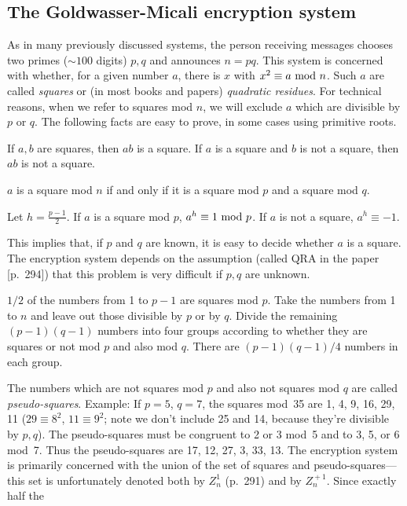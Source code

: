 \subsection{The Goldwasser-Micali encryption system}
As in many previously discussed systems, the person receiving messages
chooses two primes ($\sim100$ digits) $p,q$ and announces $n=pq$.
This system is concerned with whether, for a given number $a$, there is
$x$ with $x^2\equiv a\hbox{ mod }n$. Such $a$ are called {\it squares\/} or (in most
books and papers) {\it quadratic residues}. For technical reasons, when
we refer to squares mod $n$, we will exclude $a$ which are divisible by
$p$ or $q$.
The following facts are easy to prove, in some cases using primitive roots.
\begin{Le} If $a,b$ are squares, then $ab$ is a square.
If $a$ is a square and $b$ is not a square, then $ab$ is not a square.
\label{prod}\end{Le}
\begin{Le} $a$ is a square mod $n$ if and only if it is a square mod $p$
and a square mod $q$.\label{kn1}\end{Le}
\begin{Le} Let $h=\frac{p-1}2$.  If $a$ is a square mod $p$, $a^h\equiv1\hbox{ mod }p$.
If $a$ is not a square, $a^h\equiv-1$.\label{kn2}\end{Le}
This implies that, if $p$ and $q$ are known, it is easy to decide whether
$a$ is a square.  The encryption system depends on the assumption (called
QRA in the paper [p.~294]) that this problem is very difficult if $p,q$
are unknown.\begin{Le} $1/2$ of the numbers from 1 to $p-1$ are squares
mod $p$.     Take the numbers from 1 to $n$ and leave out those divisible
by $p$ or by $q$. Divide the remaining $(p-1)(q-1)$ numbers into four groups 
according to whether they are squares or not mod $p$ and also mod $q$.
There are $(p-1)(q-1)/4$ numbers in each group.\end{Le}
\pq The numbers which are not squares mod $p$ and also not squares mod $q$
are called {\it pseudo-squares}.  Example: If $p=5$, $q=7$, the squares
mod~35 are 1, 4, 9, 16, 29, 11 ($29\equiv8^2$, $11\equiv9^2$; 
note we don't include 25 and 14, because
they're divisible by $p,q$).  The pseudo-squares must be congruent to
2 or 3 mod~5 and to 3, 5, or 6 mod~7.  Thus the pseudo-squares are
17, 12, 27, 3, 33, 13.
\pq The encryption system is primarily concerned with the union of the
set of squares and pseudo-squares--- this set is unfortunately denoted
both by $Z^1_n$ (p.~291) and by $Z^{{}+1}_n$. Since exactly half the
